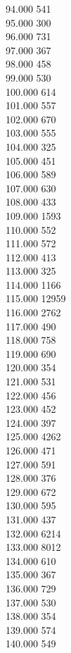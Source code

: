 { 94.000	541 \\
 95.000	300 \\
 96.000	731 \\
 97.000	367 \\
 98.000	458 \\
 99.000	530 \\
 100.000	614 \\
 101.000	557 \\
 102.000	670 \\
 103.000	555 \\
 104.000	325 \\
 105.000	451 \\
 106.000	589 \\
 107.000	630 \\
 108.000	433 \\
 109.000	1593 \\
 110.000	552 \\
 111.000	572 \\
 112.000	413 \\
 113.000	325 \\
 114.000	1166 \\
 115.000	12959 \\
 116.000	2762 \\
 117.000	490 \\
 118.000	758 \\
 119.000	690 \\
 120.000	354 \\
 121.000	531 \\
 122.000	456 \\
 123.000	452 \\
 124.000	397 \\
 125.000	4262 \\
 126.000	471 \\
 127.000	591 \\
 128.000	376 \\
 129.000	672 \\
 130.000	595 \\
 131.000	437 \\
 132.000	6214 \\
 133.000	8012 \\
 134.000	610 \\
 135.000	367 \\
 136.000	729 \\
 137.000	530 \\
 138.000	354 \\
 139.000	574 \\
 140.000	549 \\
}
